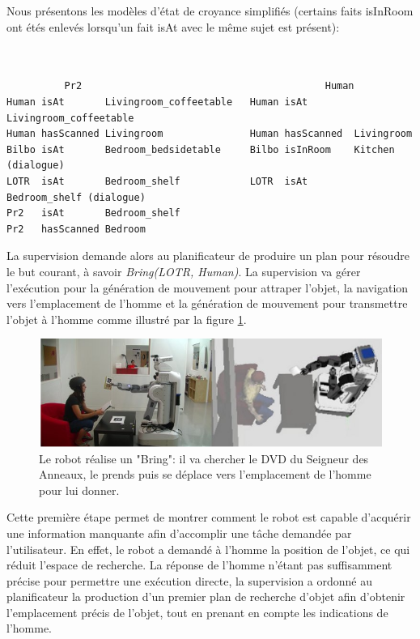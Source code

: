 \documentclass[a4paper,11pt,twoside]{StyleThese}
\begin{document}
Nous présentons les modèles d'état de croyance simplifiés (certains faits isInRoom ont étés enlevés lorsqu'un fait isAt avec le même sujet est présent):

\begin{scriptsize}
\begin{verbatim}


          Pr2                                          Human
Human isAt       Livingroom_coffeetable   Human isAt        Livingroom_coffeetable
Human hasScanned Livingroom               Human hasScanned  Livingroom
Bilbo isAt       Bedroom_bedsidetable     Bilbo isInRoom    Kitchen (dialogue)
LOTR  isAt       Bedroom_shelf            LOTR  isAt        Bedroom_shelf (dialogue)
Pr2   isAt       Bedroom_shelf                
Pr2   hasScanned Bedroom

\end{verbatim}
\end{scriptsize}

La supervision demande alors au planificateur de produire un plan pour résoudre le but courant, à savoir \textit{Bring(LOTR, Human)}.
La supervision va gérer l'exécution pour la génération de mouvement pour attraper l'objet, la navigation vers l'emplacement de l'homme et la génération de mouvement pour transmettre l'objet à l'homme comme illustré par la figure \ref{fig:mardiDemo3}.


\begin{figure}[ht!]
 \centering
  \includegraphics[width=0.99\linewidth]{./img/real2.jpg} 
  \caption {Le robot réalise un "Bring": il va chercher le DVD du Seigneur des Anneaux, le prends puis se déplace vers l'emplacement de l'homme pour lui donner.}
  \label{fig:mardiDemo3}
\end{figure}

Cette première étape permet de montrer comment le robot est capable d'acquérir une information manquante afin d'accomplir une tâche demandée par l'utilisateur. En effet, le robot a demandé à l'homme la position de l'objet, ce qui réduit l'espace de recherche. La réponse de l'homme n'étant pas suffisamment précise pour permettre une exécution directe, la supervision a ordonné au planificateur la production d'un premier plan de recherche d'objet afin d'obtenir l'emplacement précis de l'objet, tout en prenant en compte les indications de l'homme.
\end{document}
